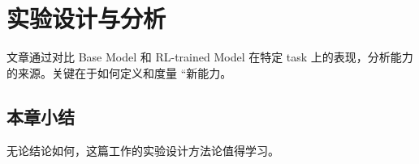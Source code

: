 \section{实验设计与分析}
文章通过对比 Base Model 和 RL-trained Model 在特定 task 上的表现，分析能力的来源。关键在于如何定义和度量 ``新能力。

\subsection{本章小结}
无论结论如何，这篇工作的实验设计方法论值得学习。

\newpage
